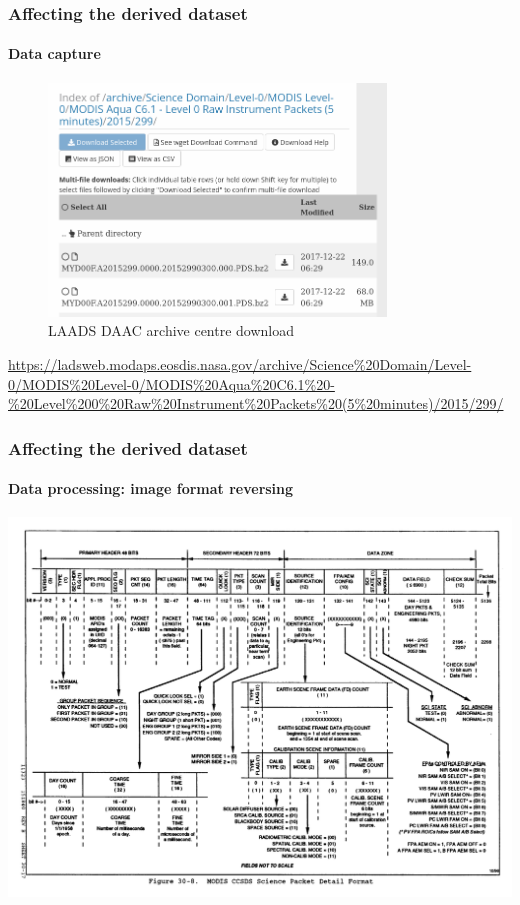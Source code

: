 \documentclass{beamer}
\begin{document}
\begin{frame}
  \frametitle{Affecting the derived dataset}
  \framesubtitle{Data capture}
  \begin{figure}
    \includegraphics[width=0.8\textwidth]{images/level0.png}
    \caption{LAADS DAAC archive centre download}
    \label{fig:level0}
  \end{figure}  
  \url{https://ladsweb.modaps.eosdis.nasa.gov/archive/Science\%20Domain/Level-0/MODIS\%20Level-0/MODIS\%20Aqua\%20C6.1\%20-\%20Level\%200\%20Raw\%20Instrument\%20Packets\%20(5\%20minutes)/2015/299/}

\end{frame}

\begin{frame}
  \frametitle{Affecting the derived dataset}
  \framesubtitle{Data processing: image format reversing}
  \includegraphics[width=\textwidth]{images/image_format.png}

\end{frame}
\end{document}
